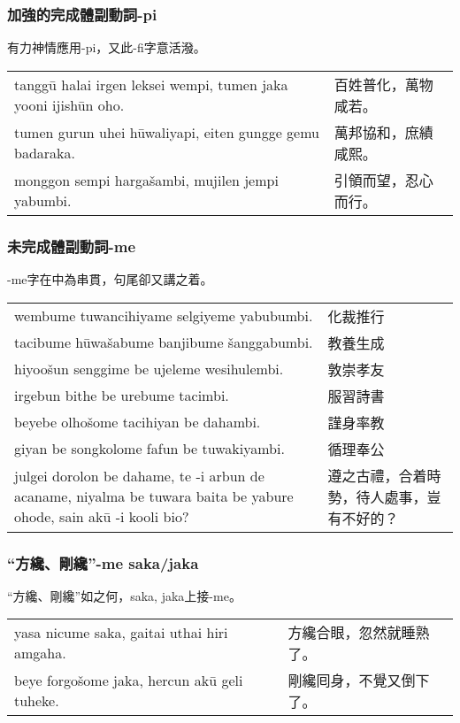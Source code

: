\documentclass{article}
\begin{document}
\subsubsection{加強的完成體副動詞-pi}
\noindent 有力神情應用-pi，又此-fi字意活潑。
\begin{center}
    \begin{tabularx}{\textwidth}{XX}
        tangg\={u} halai irgen leksei wempi, tumen jaka yooni ijish\={u}n oho. & 百姓普化，萬物咸若。\\
        tumen gurun uhei h\={u}waliyapi, eiten gungge gemu badaraka. & 萬邦協和，庶績咸熙。\\
        monggon sempi harga\v{s}ambi, mujilen jempi yabumbi. & 引領而望，忍心而行。
    \end{tabularx}
\end{center}

\subsubsection{未完成體副動詞-me}
\noindent -me字在中為串貫，句尾卻又講之着。
\begin{center}
    \begin{tabularx}{\textwidth}{XX}
        wembume tuwancihiyame selgiyeme yabubumbi. & 化裁推行\\
        tacibume h\={u}wa\v{s}abume banjibume \v{s}anggabumbi. & 教養生成\\
        hiyoo\v{s}un senggime be ujeleme wesihulembi. & 敦崇孝友\\
        irgebun bithe be urebume tacimbi. & 服習詩書\\
        beyebe olho\v{s}ome tacihiyan be dahambi. & 謹身率教\\
        giyan be songkolome fafun be tuwakiyambi. & 循理奉公\\
        julgei dorolon be dahame, te -i arbun de acaname, niyalma be tuwara baita be yabure ohode, sain ak\={u} -i kooli bio? & 遵之古禮，合着時勢，待人處事，豈有不好的？
    \end{tabularx}
\end{center}

\subsubsection{“方纔、剛纔”-me saka/jaka}
\noindent “方纔、剛纔”如之何，saka, jaka上接-me。
\begin{center}
    \begin{tabularx}{\textwidth}{XX}
        yasa nicume saka, gaitai uthai hiri amgaha. & 方纔合眼，忽然就睡熟了。\\
        beye forgo\v{s}ome jaka, hercun ak\={u} geli tuheke. & 剛纔囘身，不覺又倒下了。
    \end{tabularx}
\end{center}
\end{document}

